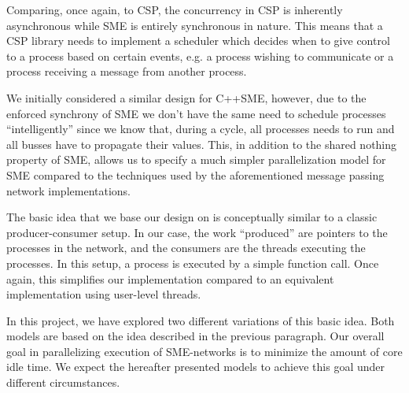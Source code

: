 Comparing, once again, to CSP, the concurrency in CSP is inherently
asynchronous while SME is entirely synchronous in nature. This means
that a CSP library needs to implement a scheduler which decides when
to give control to a process based on certain events, e.g. a process
wishing to communicate or a process receiving a message from another
process.

We initially considered a similar design for C++SME, however, due to
the enforced synchrony of SME we don't have the same need to schedule
processes ``intelligently'' since we know that, during a cycle, all
processes needs to run and all busses have to propagate their
values. This, in addition to the shared nothing property of SME, allows
us to specify a much simpler parallelization model for SME compared to
the techniques used by the aforementioned message passing network
implementations.

The basic idea that we base our design on is conceptually similar to a
classic producer-consumer setup. In our case, the work ``produced''
are pointers to the processes in the network, and the consumers are the threads
executing the processes. In this setup, a process is executed by a
simple function call. Once again, this simplifies our implementation
compared to an equivalent implementation using user-level threads.




In this project, we have explored two different variations of this
basic idea. Both models are based on the idea described in the
previous paragraph. Our overall goal in parallelizing execution of
SME-networks is to minimize the amount of core idle time. We expect
the hereafter presented models to achieve this goal under different
circumstances.



